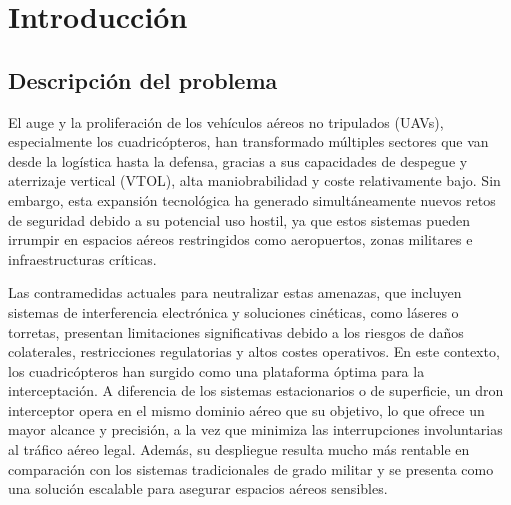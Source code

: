 \clearpage


\chapter*{Introducción}
\vspace{-1.5cm}
\noindent\HRule\par\vspace{0.1cm} %

\setcounter{chapter}{1} %
\setcounter{section}{0} %

\section{Descripción del problema} %

El auge y la proliferación de los vehículos aéreos no tripulados (UAVs), especialmente los cuadricópteros, han transformado múltiples sectores que van desde la logística hasta la defensa, gracias a sus capacidades de despegue y aterrizaje vertical (VTOL), alta maniobrabilidad y coste relativamente bajo. Sin embargo, esta expansión tecnológica ha generado simultáneamente nuevos retos de seguridad debido a su potencial uso hostil, ya que estos sistemas pueden irrumpir en espacios aéreos restringidos como aeropuertos, zonas militares e infraestructuras críticas.

\vspace{0.4cm}

Las contramedidas actuales para neutralizar estas amenazas, que incluyen sistemas de interferencia electrónica y soluciones cinéticas, como láseres o torretas, presentan limitaciones significativas debido a los riesgos de daños colaterales, restricciones regulatorias y altos costes operativos. En este contexto, los cuadricópteros han surgido como una plataforma óptima para la interceptación. A diferencia de los sistemas estacionarios o de superficie, un dron interceptor opera en el mismo dominio aéreo que su objetivo, lo que ofrece un mayor alcance y precisión, a la vez que minimiza las interrupciones involuntarias al tráfico aéreo legal. Además, su despliegue resulta mucho más rentable en comparación con los sistemas tradicionales de grado militar y se presenta como una solución escalable para asegurar espacios aéreos sensibles.




